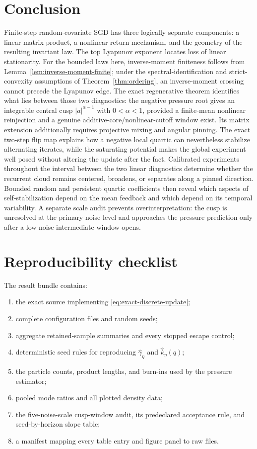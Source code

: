 \documentclass[11pt]{article}
\theoremstyle{definition}
\begin{document}
\section{Conclusion}

Finite-step random-covariate SGD has three logically separate components: a
linear matrix product, a nonlinear return mechanism, and the geometry of the
resulting invariant law.  The top Lyapunov exponent locates loss of linear
stationarity.  For the bounded laws here, inverse-moment finiteness follows
from Lemma~\ref{lem:inverse-moment-finite}; under the spectral-identification
and strict-convexity assumptions of Theorem~\ref{thm:ordering}, an
inverse-moment crossing cannot precede the Lyapunov edge.  The exact
regenerative theorem identifies what lies between those two diagnostics:
the negative pressure root gives an integrable central cusp
$|a|^{\alpha-1}$ with $0<\alpha<1$, provided a finite-mean nonlinear
reinjection and a genuine additive-core/nonlinear-cutoff window exist.  Its
matrix extension additionally requires projective mixing and angular
pinning.  The exact
two-step flip map explains how a negative local quartic can
nevertheless stabilize alternating iterates, while the saturating potential
makes the global experiment well posed without altering the update after the
fact.  Calibrated experiments throughout the interval between the two linear
diagnostics determine whether the recurrent cloud remains centered, broadens,
or separates along a pinned direction.  Bounded random and persistent
quartic coefficients then reveal which aspects of self-stabilization depend
on the mean feedback and which depend on its temporal variability.  A
separate scale audit prevents overinterpretation: the cusp is unresolved at
the primary noise level and approaches the pressure prediction only after a
low-noise intermediate window opens.

\appendix

\section{Reproducibility checklist}

The result bundle contains:
\begin{enumerate}[leftmargin=2em]
  \item the exact source implementing \eqref{eq:exact-discrete-update};
  \item complete configuration files and random seeds;
  \item aggregate retained-sample summaries and every stopped escape control;
  \item deterministic seed rules for reproducing
  $\widehat\gamma_\eta$ and $\widehat k_\eta(q)$;
  \item the particle counts, product lengths, and burn-ins used by the
  pressure estimator;
  \item pooled mode ratios and all plotted density data;
  \item the five-noise-scale cusp-window audit, its predeclared acceptance
  rule, and seed-by-horizon slope table;
  \item a manifest mapping every table entry and figure panel to raw files.
\end{enumerate}
\end{document}
